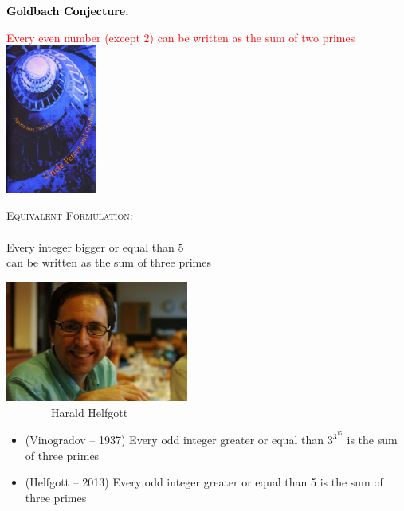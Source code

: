 \documentclass[landscape,display]{powersem} %
\newcommand{\heading}[1]{%
 \begin{center}
  \large\bf
  \shadowbox{{\textcolor{conceptcolor}{#1}}}%
 \end{center}
 \vspace{1ex minus 1ex}}
\begin{document}
\begin{slide}
\heading{The five conjectures of today -- are there news? }\pause

\textcolor{blue}{}\textcolor{black}{\textbf{Goldbach Conjecture.}} 

\textcolor{red}{Every even number (except $2$) can be written as the sum of two primes}\pause
 \includegraphics[width=3cm]{images/petros.jpg}\pause
\vspace{-2cm}\hspace*{4cm}
\begin{minipage}{7cm}
\textsc{Equivalent Formulation:}\\
\\
Every integer bigger or equal than $5$ \\
can be written as the sum of three primes\end{minipage}

\end{slide}

\begin{slide}
 \heading{From Vinogradov to Helfgott}

 \includegraphics[width=6cm]{images/helfgott.jpg}\\ \ \ \ \ \ \ \ \ Harald Helfgott\pause
\vspace{-4cm}\hspace*{6cm}
\begin{minipage}{5cm}
\begin{itemize}
 \item (Vinogradov -- 1937) Every odd integer greater or equal than  $3^{3^{15}}$  is the sum of three primes
 \item (Helfgott -- 2013) Every odd integer greater or equal than  5 is the sum of three primes
\end{itemize}
\end{minipage}
\end{slide}
\end{document}
